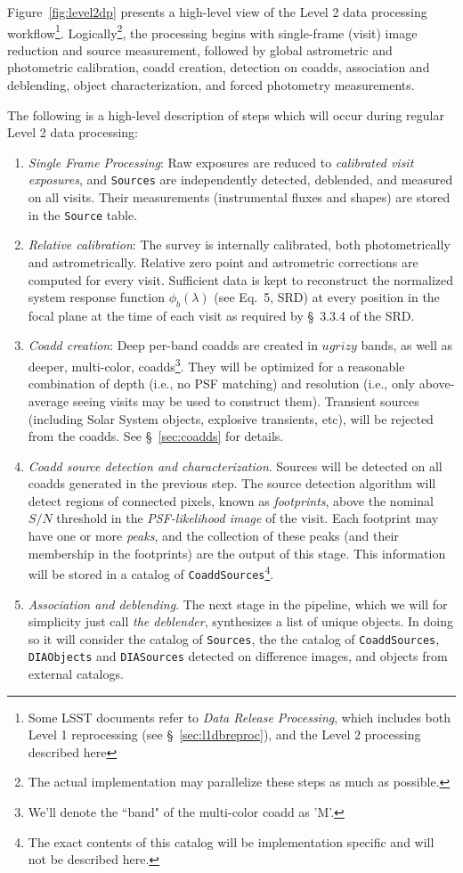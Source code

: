 \documentclass[12pt]{article}
\newcommand{\code}[1]{\texttt{#1}}
\newcommand{\DIASources}{\code{DIASources}\xspace}
\newcommand{\DIAObjects}{\code{DIAObjects}\xspace}
\newcommand{\Source}{\code{Source}\xspace}
\newcommand{\Sources}{\code{Sources}\xspace}
\newcommand{\CoaddSources}{\code{CoaddSources}\xspace}
\begin{document}
Figure~\ref{fig:level2dp} presents a high-level view of the Level 2 data processing workflow\footnote{Some LSST documents refer to {\em Data Release Processing}, which includes both Level 1 reprocessing (see \S~\ref{sec:l1dbreproc}), and the Level 2 processing described here}. Logically\footnote{The actual implementation may parallelize these steps as much as possible.}, the processing begins with single-frame (visit) image reduction and source measurement, followed by global astrometric and photometric calibration, coadd creation, detection on coadds, association and deblending, object characterization, and forced photometry measurements.

The following is a high-level description of steps which will occur during regular Level 2 data processing:
\begin{enumerate}
    \item {\em Single Frame Processing}: Raw exposures are reduced to {\em calibrated visit exposures}, and \Sources are independently detected, deblended, and measured on all visits. Their measurements (instrumental fluxes and shapes) are stored in the \Source table.
    \item {\em Relative calibration}: The survey is internally calibrated, both photometrically and astrometrically. Relative zero point and astrometric corrections are computed for every visit. Sufficient data is kept to reconstruct the normalized system response function $\phi_b(\lambda)$ (see Eq.~5, SRD) at every position in the focal plane at the time of each visit as required by \S~3.3.4 of the SRD.
    \item {\em Coadd creation}: Deep per-band coadds are created in $ugrizy$ bands, as well as deeper, multi-color, coadds\footnote{We'll denote the ``band" of the multi-color coadd as 'M'.}. They will be optimized for a reasonable combination of depth (i.e., no PSF matching) and resolution (i.e., only above-average seeing visits may be used to construct them). Transient sources (including Solar System objects, explosive transients, etc), will be rejected from the coadds. See \S~\ref{sec:coadds} for details.
    \item {\em Coadd source detection and characterization}. Sources will be detected on all coadds generated in the previous step. The source detection algorithm will detect regions of connected pixels, known as {\em footprints}, above the nominal $S/N$ threshold in the {\em PSF-likelihood image} of the visit. Each footprint may have one or more {\em peaks}, and the collection of these peaks (and their membership in the footprints) are the output of this stage. This information will be stored in a catalog of \CoaddSources\footnote{The exact contents of this catalog will be implementation specific and will not be described here.}.
    \item {\em Association and deblending}. The next stage in the pipeline, which we will for simplicity just call {\em the deblender}, synthesizes a list of unique objects. In doing so it will consider the catalog of \Sources, the the catalog of \CoaddSources, \DIAObjects and \DIASources detected on difference images, and objects from external catalogs.
    

\end{enumerate}
\end{document}
